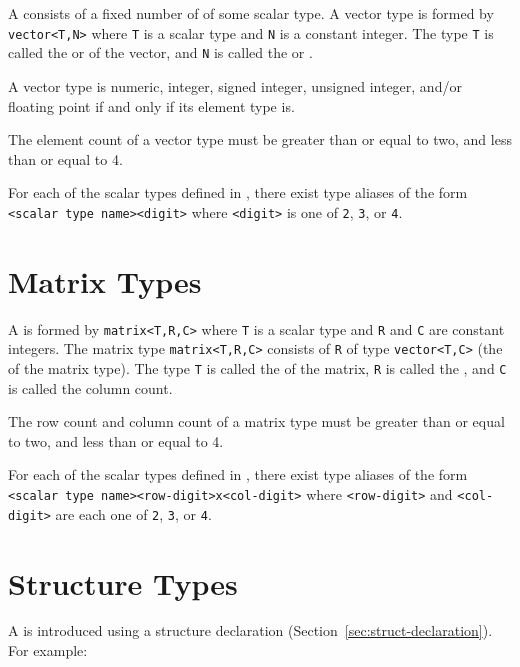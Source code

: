 A  consists of a fixed number of  of some scalar type.
A vector type is formed by \lstinline|vector<T,N>| where \lstinline|T| is a scalar type and \lstinline|N| is a constant integer.
The type \lstinline|T| is called the  or  of the vector, and \lstinline|N| is called the  or .

A vector type is numeric, integer, signed integer, unsigned integer, and/or floating point if and only if its element type is.

The element count of a vector type must be greater than or equal to two, and less than or equal to 4.

For each of the scalar types defined in \label{sec:scalar-types}, there exist type aliases of the form \lstinline|<scalar type name><digit>| where \lstinline|<digit>| is one of \lstinline|2|, \lstinline|3|, or \lstinline|4|.

\section{Matrix Types}

A  is formed by \lstinline|matrix<T,R,C>| where \lstinline|T| is a scalar type and \lstinline|R| and \lstinline|C| are constant integers.
The matrix type \lstinline|matrix<T,R,C>| consists of \lstinline|R|  of type \lstinline|vector<T,C>| (the  of the matrix type).
The type \lstinline|T| is called the  of the matrix, \lstinline|R| is called the , and \lstinline|C| is called the column count.

The row count and column count of a matrix type must be greater than or equal to two, and less than or equal to 4.

For each of the scalar types defined in \label{sec:scalar-types}, there exist type aliases of the form \lstinline|<scalar type name><row-digit>x<col-digit>| where \lstinline|<row-digit>| and \lstinline|<col-digit>| are each one of \lstinline|2|, \lstinline|3|, or \lstinline|4|.

\section{Structure Types}

A  is introduced using a structure declaration (Section~\ref{sec:struct-declaration}).
For example:

